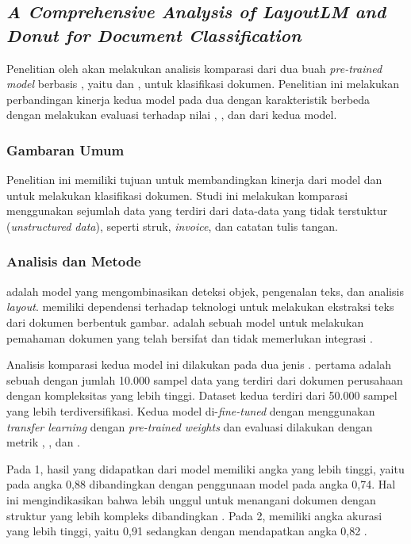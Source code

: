 \subsection{\textit{A Comprehensive Analysis of LayoutLM and Donut for Document Classification}}
\label{sec:penelitian-1}
Penelitian oleh   akan melakukan analisis komparasi dari dua buah \textit{pre-trained model} berbasis \transformer{}, yaitu \layoutlm{} dan \donut, untuk klasifikasi dokumen. Penelitian ini melakukan perbandingan kinerja kedua model pada dua \dataset{} dengan karakteristik berbeda dengan melakukan evaluasi 
terhadap nilai \accuracy, \precision, dan \fscore{} dari kedua model. 

\subsubsection{Gambaran Umum}
Penelitian ini memiliki tujuan untuk membandingkan kinerja dari model \donut{} dan \layoutlm{} untuk melakukan klasifikasi dokumen. Studi ini 
melakukan komparasi menggunakan sejumlah data yang terdiri dari data-data yang tidak terstuktur (\textit{unstructured data}), seperti struk, \textit{invoice}, dan catatan tulis tangan.

\subsubsection{Analisis dan Metode}
\layoutlm{} adalah model yang mengombinasikan deteksi objek, pengenalan teks, dan analisis \textit{layout}. \layoutlm{} memiliki dependensi terhadap teknologi \ocr{} untuk melakukan ekstraksi teks dari dokumen berbentuk gambar. \donut{} adalah sebuah model \transformer{} untuk melakukan pemahaman dokumen yang telah bersifat \sotafull{} dan tidak memerlukan integrasi \ocr{}.

Analisis komparasi kedua model ini dilakukan pada dua jenis \dataset. \datasetfl{} pertama adalah sebuah \dataset{} dengan jumlah 10.000 sampel data yang terdiri dari dokumen perusahaan dengan kompleksitas yang lebih tinggi. Dataset 
kedua terdiri dari 50.000 sampel yang lebih terdiversifikasi. Kedua model di-\textit{fine-tuned} dengan menggunakan \textit{transfer learning} dengan \textit{pre-trained weights} dan evaluasi dilakukan dengan metrik \accuracy, \precision, dan \fscore.  

Pada \dataset{} 1, hasil yang didapatkan dari model \layoutlm{} memiliki angka yang lebih tinggi, yaitu pada angka 0,88 dibandingkan dengan penggunaan model \donut{} pada angka 0,74. Hal ini mengindikasikan bahwa \layoutlm{} lebih unggul untuk menangani dokumen dengan struktur yang lebih kompleks dibandingkan \donut{}. Pada \dataset{} 2, \donut{} memiliki angka akurasi yang lebih tinggi, yaitu 0,91 sedangkan \layoutlm{} dengan mendapatkan angka 0,82 \parencite{bajrami2023comprehensive}.

